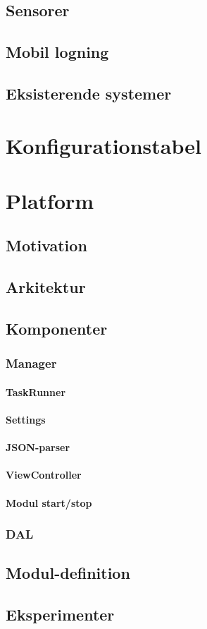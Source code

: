 \section{Sensorer}
\section{Mobil logning}
\section{Eksisterende systemer}
\chapter{Konfigurationstabel}
\chapter{Platform}
\section{Motivation} %
\section{Arkitektur}
\section{Komponenter}
\subsection{Manager}
\subsubsection{TaskRunner}
\subsubsection{Settings}
\subsubsection{JSON-parser}
\subsubsection{ViewController} %
\subsubsection{Modul start/stop} %
\subsection{DAL}
\section{Modul-definition}
\section{Eksperimenter}

\printbibliography[heading=bibintoc]
\label{bib:mybiblio}

